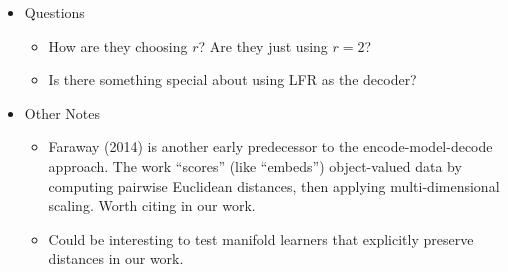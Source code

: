 \begin{itemize}
\begin{itemize}
        \item Even though they compute conditional expectations in representation space then decode, their inferential targets are expectations in object space. This approximation, $\text{Decode}\{ \mathbb{E}(Z) \} \approx \mathbb{E} \{ \text{Decode}(Z) \}$, does not hold in general. In their setting, I think the approximation holds provided the representation space is geodesic-preserving. 
        \begin{itemize}
            \item Their approximation depends on ISOMAP reliably preserving geodesics. While they account for the bias introduced by ISOMAP in Theorem 2, the nature of this bias is not understood. 
            \item Choosing the latent dimension seems like an important question in their setting -- wrong choice of $r$ leads to representation that doesn't preserve geodesics, which leads to bad approximation. Do they describe how to choose $r$?
        \end{itemize}

        \item DNNs are learned independently in representation space. Not clear whether independent fitting is justified.

        \item DFR does not offer an inferential toolbox -- no testing, confidence intervals, etc. 

        \item LFR uses fitted values from DNNs to predict object-valued response. This decoding strategy is not cursed by dimensionality provided the latent dimension $r$ is small. However, LFR may struggle to stably decode for complex object data with moderate-to-large $r$.
        
    \end{itemize}

    \item Questions
    \begin{itemize}
        \item How are they choosing $r$? Are they just using $r = 2$?
        \item Is there something special about using LFR as the decoder?
    \end{itemize}

    \item Other Notes
    \begin{itemize}
        \item Faraway (2014) is another early predecessor to the encode-model-decode approach. The work ``scores'' (like ``embeds'') object-valued data by computing pairwise Euclidean distances, then applying multi-dimensional scaling. Worth citing in our work.
        \item Could be interesting to test manifold learners that explicitly preserve distances in our work. 
    \end{itemize}

    
\end{itemize}